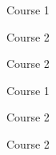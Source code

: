 

\begin{cvcourses}
  
  \cvcourse
      
  {Course 1}
      
  {Course 2}
      
  {Course 2}
      
    
  
  \cvcourse
      
  {Course 1}
      
  {Course 2}
      
  {Course 2}
      
    
  
\end{cvcourses}


